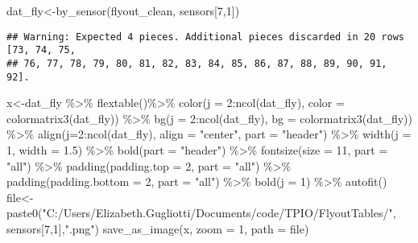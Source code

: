 \documentclass[
]{article}
\newenvironment{Shaded}{\begin{snugshade}}{\end{snugshade}}
\newcommand{\AttributeTok}[1]{\textcolor[rgb]{0.77,0.63,0.00}{#1}}
\newcommand{\DecValTok}[1]{\textcolor[rgb]{0.00,0.00,0.81}{#1}}
\newcommand{\FloatTok}[1]{\textcolor[rgb]{0.00,0.00,0.81}{#1}}
\newcommand{\FunctionTok}[1]{\textcolor[rgb]{0.00,0.00,0.00}{#1}}
\newcommand{\NormalTok}[1]{#1}
\newcommand{\OtherTok}[1]{\textcolor[rgb]{0.56,0.35,0.01}{#1}}
\newcommand{\SpecialCharTok}[1]{\textcolor[rgb]{0.00,0.00,0.00}{#1}}
\newcommand{\StringTok}[1]{\textcolor[rgb]{0.31,0.60,0.02}{#1}}
\begin{document}
\begin{Shaded}
\begin{Highlighting}[]
\NormalTok{dat\_fly}\OtherTok{\textless{}{-}}\FunctionTok{by\_sensor}\NormalTok{(flyout\_clean, sensors[}\DecValTok{7}\NormalTok{,}\DecValTok{1}\NormalTok{])}
\end{Highlighting}
\end{Shaded}

\begin{verbatim}
## Warning: Expected 4 pieces. Additional pieces discarded in 20 rows [73, 74, 75,
## 76, 77, 78, 79, 80, 81, 82, 83, 84, 85, 86, 87, 88, 89, 90, 91, 92].
\end{verbatim}

\begin{Shaded}
\begin{Highlighting}[]
\NormalTok{x}\OtherTok{\textless{}{-}}\NormalTok{dat\_fly }\SpecialCharTok{\%\textgreater{}\%}
    \FunctionTok{flextable}\NormalTok{()}\SpecialCharTok{\%\textgreater{}\%}
    \FunctionTok{color}\NormalTok{(}\AttributeTok{j =} \DecValTok{2}\SpecialCharTok{:}\FunctionTok{ncol}\NormalTok{(dat\_fly), }\AttributeTok{color =} \FunctionTok{colormatrix3}\NormalTok{(dat\_fly)) }\SpecialCharTok{\%\textgreater{}\%}
    \FunctionTok{bg}\NormalTok{(}\AttributeTok{j =} \DecValTok{2}\SpecialCharTok{:}\FunctionTok{ncol}\NormalTok{(dat\_fly), }\AttributeTok{bg =} \FunctionTok{colormatrix3}\NormalTok{(dat\_fly)) }\SpecialCharTok{\%\textgreater{}\%}
    \FunctionTok{align}\NormalTok{(}\AttributeTok{j=}\DecValTok{2}\SpecialCharTok{:}\FunctionTok{ncol}\NormalTok{(dat\_fly), }\AttributeTok{align =} \StringTok{"center"}\NormalTok{, }\AttributeTok{part =} \StringTok{"header"}\NormalTok{) }\SpecialCharTok{\%\textgreater{}\%}
    \FunctionTok{width}\NormalTok{(}\AttributeTok{j =} \DecValTok{1}\NormalTok{, }\AttributeTok{width =} \FloatTok{1.5}\NormalTok{) }\SpecialCharTok{\%\textgreater{}\%}
    \FunctionTok{bold}\NormalTok{(}\AttributeTok{part =} \StringTok{"header"}\NormalTok{) }\SpecialCharTok{\%\textgreater{}\%}
    \FunctionTok{fontsize}\NormalTok{(}\AttributeTok{size =} \DecValTok{11}\NormalTok{, }\AttributeTok{part =} \StringTok{"all"}\NormalTok{) }\SpecialCharTok{\%\textgreater{}\%}
    \FunctionTok{padding}\NormalTok{(}\AttributeTok{padding.top =} \DecValTok{2}\NormalTok{, }\AttributeTok{part =} \StringTok{"all"}\NormalTok{) }\SpecialCharTok{\%\textgreater{}\%}
    \FunctionTok{padding}\NormalTok{(}\AttributeTok{padding.bottom =} \DecValTok{2}\NormalTok{, }\AttributeTok{part =} \StringTok{"all"}\NormalTok{) }\SpecialCharTok{\%\textgreater{}\%}
    \FunctionTok{bold}\NormalTok{(}\AttributeTok{j =} \DecValTok{1}\NormalTok{) }\SpecialCharTok{\%\textgreater{}\%} \FunctionTok{autofit}\NormalTok{()}
\NormalTok{file}\OtherTok{\textless{}{-}}\FunctionTok{paste0}\NormalTok{(}\StringTok{"C:/Users/Elizabeth.Gugliotti/Documents/code/TPIO/FlyoutTables/"}\NormalTok{, sensors[}\DecValTok{7}\NormalTok{,}\DecValTok{1}\NormalTok{],}\StringTok{".png"}\NormalTok{)}
\FunctionTok{save\_as\_image}\NormalTok{(x, }\AttributeTok{zoom =} \DecValTok{1}\NormalTok{, }\AttributeTok{path =}\NormalTok{ file)}
\end{Highlighting}
\end{Shaded}
\end{document}
